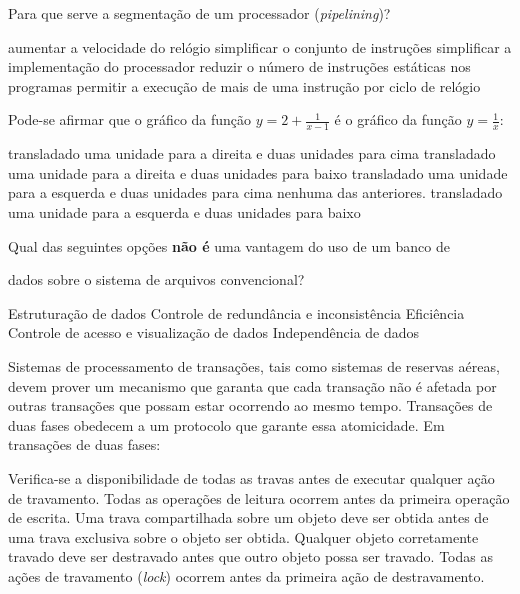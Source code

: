\documentclass[12pt, addpoints]{exam}
\begin{document}
\begin{questions}
\question

Para que serve a segmentação de um processador (\textit{pipelining})?
\begin{choices}
\choice aumentar a velocidade do relógio
\choice simplificar o conjunto de instruções
\choice simplificar a implementação do processador
\choice reduzir o número de instruções estáticas nos programas
\choice permitir a execução de mais de uma instrução por ciclo de relógio
\end{choices}

\question

Pode-se afirmar que o gráfico da função \(y = 2 + \frac{1}{x - 1}\) é o gráfico da função \(y = \frac{1}{x}\):
\begin{choices}
\choice transladado uma unidade para a direita e duas unidades para cima
\choice transladado uma unidade para a direita e duas unidades para baixo
\choice transladado uma unidade para a esquerda e duas unidades para cima
\choice nenhuma das anteriores.
\choice transladado uma unidade para a esquerda e duas unidades para baixo
\end{choices}

\question

Qual das seguintes opções \textbf{não é} uma vantagem do uso de um banco de

dados sobre o sistema de arquivos convencional?


\begin{choices}
\choice Estruturação de dados
\choice Controle de redundância e inconsistência
\choice Eficiência
\choice Controle de acesso e visualização de dados
\choice Independência de dados
\end{choices}

\question

Sistemas de processamento de transações, tais como sistemas de reservas aéreas, devem prover um mecanismo que garanta que cada transação não é afetada por outras transações que possam estar ocorrendo ao mesmo tempo. Transações de duas fases obedecem a um protocolo que garante essa atomicidade. Em transações de duas fases:


\begin{choices}
\choice Verifica-se a disponibilidade de todas as travas antes de executar qualquer ação de travamento.
\choice Todas as operações de leitura ocorrem antes da primeira operação de escrita.
\choice Uma trava compartilhada sobre um objeto deve ser obtida antes de uma trava exclusiva sobre o objeto ser obtida.
\choice Qualquer objeto corretamente travado deve ser destravado antes que outro objeto possa ser travado.
\choice Todas as ações de travamento (\textit{lock}) ocorrem antes da primeira ação de destravamento.
\end{choices}


\end{questions}
\end{document}
